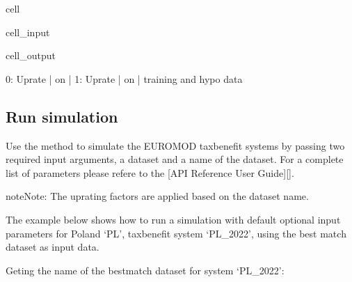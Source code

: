 \documentclass[letterpaper,10pt,english]{sphinxmanual}
\begin{document}
\begin{sphinxuseclass}{cell}
\begin{sphinxuseclass}{cell_input}
\begin{sphinxVerbatim}[commandchars=\\\{\}]
\PYG{p}{[}\PYG{p}{]}\PYG{p}{[}\PYG{p}{]} 
\end{sphinxVerbatim}

\end{sphinxuseclass}
\begin{sphinxuseclass}{cell_output}
\begin{sphinxVerbatim}[commandchars=\\\{\}]
0: Uprate     | on      |     
1: Uprate     | on      |    training and hypo data 
\end{sphinxVerbatim}

\end{sphinxuseclass}
\end{sphinxuseclass}

\subsection{Run simulation}
\label{\detokenize{notebooks/userguide:run-simulation}}
\sphinxAtStartPar
Use the  method to simulate the EUROMOD tax\sphinxhyphen{}benefit systems by passing two required input arguments, a  dataset and a name of the dataset. For a complete list of parameters please refere to the {[}API Reference User Guide{]}{[}{]}.

\begin{sphinxadmonition}{note}{Note:}
\sphinxAtStartPar
The uprating factors are applied based on the dataset name.
\end{sphinxadmonition}

\sphinxAtStartPar
The example below shows how to run a simulation with default optional input parameters for Poland ‘PL’, tax\sphinxhyphen{}benefit system ‘PL\_2022’, using the best match dataset as input data.

\sphinxAtStartPar
Geting the name of the best\sphinxhyphen{}match dataset for system ‘PL\_2022’:
\end{document}
